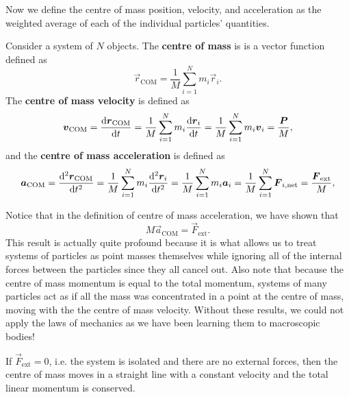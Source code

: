 \documentclass[../classical_mechanics.tex]{subfiles}
\begin{document}
        Now we define the centre of mass position, velocity, and acceleration as the weighted average of each of the individual particles' quantities.
        \begin{definition}
            Consider a system of $N$ objects.
            The \textbf{centre of mass} is is a vector function defined as
            \begin{equation}
                \vec{r}_\text{COM}=\frac{1}{M}\sum_{i=1}^N m_i\vec{r}_i.
            \end{equation}
            The \textbf{centre of mass velocity} is defined as
            \begin{equation}
                \vec{v}_\text{COM}=\dv{\vec{r}_\text{COM}}{t}=\frac{1}{M}\sum_{i=1}^N m_i\dv{\vec{r}_i}{t}=\frac{1}{M}\sum_{i=1}^N m_i\vec{v}_i=\frac{\vec{P}}{M},
            \end{equation}
            and the \textbf{centre of mass acceleration} is defined as
            \begin{equation}
                \vec{a}_\text{COM}=\dv[2]{\vec{r}_\text{COM}}{t}=\frac{1}{M}\sum_{i=1}^N m_i\dv[2]{\vec{r}_i}{t}=\frac{1}{M}\sum_{i=1}^N m_i\vec{a}_i=\frac{1}{M}\sum_{i=1}^N\vec{F}_{i,\text{net}}=\frac{\vec{F}_\text{ext}}{M},
            \end{equation}
        \end{definition}
        Notice that in the definition of centre of mass acceleration, we have shown that
        \begin{equation}\label{eq-NII-macroscopic}
            M\vec{a}_\text{COM}=\vec{F}_\text{ext}.
        \end{equation}
        This result is actually quite profound because it is what allows us to treat systems of particles as point masses themselves while ignoring all of the internal forces between the particles since they all cancel out.
        Also note that because the centre of mass momentum is equal to the total momentum, systems of many particles act as if all the mass was concentrated in a point at the centre of mass, moving with the the centre of mass velocity.
        Without these results, we could not apply the laws of mechanics as we have been learning them to macroscopic bodies!

        If $\vec{F}_\text{ext}=0$, i.e. the system is isolated and there are no external forces, then the centre of mass moves in a straight line with a constant velocity and the total linear momentum is conserved.
\end{document}
